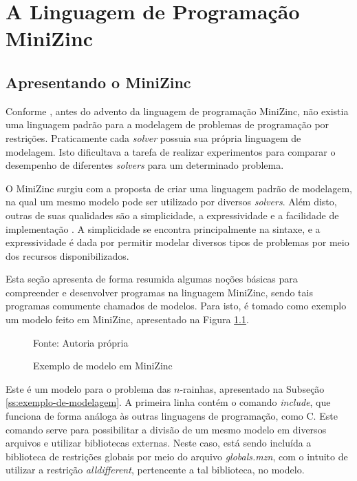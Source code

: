 \chapter{A Linguagem de Programação MiniZinc}


\section{Apresentando o MiniZinc}
\label{sc:minizinc}

Conforme \cite{mzntwds}, antes do advento da linguagem de programação MiniZinc, não existia uma linguagem padrão para a modelagem de problemas de programação por restrições. Praticamente cada \textit{solver} possuia sua própria linguagem de modelagem. Isto dificultava a tarefa de realizar experimentos para comparar o desempenho de diferentes \textit{solvers} para um determinado problema.

O MiniZinc surgiu com a proposta de criar uma linguagem padrão de modelagem, na qual um mesmo modelo pode ser utilizado por diversos \textit{solvers}. Além disto, outras de suas qualidades são a simplicidade, a expressividade e a facilidade de implementação \cite{mzntwds}. A simplicidade se encontra principalmente na sintaxe, e a expressividade é dada por permitir modelar diversos tipos de problemas por meio dos recursos disponibilizados.

Esta seção apresenta de forma resumida algumas noções básicas para compreender e desenvolver programas na linguagem MiniZinc, sendo tais programas comumente chamados de modelos. Para isto, é tomado como exemplo um modelo feito em MiniZinc, apresentado na Figura \ref{code:exemple}.

\begin{figure}[!ht]
  \centering
  \caption{Exemplo de modelo em MiniZinc}
  \label{code:exemple}
  
  Fonte: Autoria própria
\end{figure}

Este é um modelo para o problema das $n$-rainhas, apresentado na Subseção \ref{ss:exemplo-de-modelagem}. A primeira linha contém o comando \textit{include}, que funciona de forma análoga às outras linguagens de programação, como C. Este comando serve para possibilitar a divisão de um mesmo modelo em diversos arquivos e utilizar bibliotecas externas. Neste caso, está sendo incluída a biblioteca de restrições globais por meio do arquivo \textit{globals.mzn}, com o intuito de utilizar a restrição \textit{alldifferent}, pertencente a tal biblioteca, no modelo.

